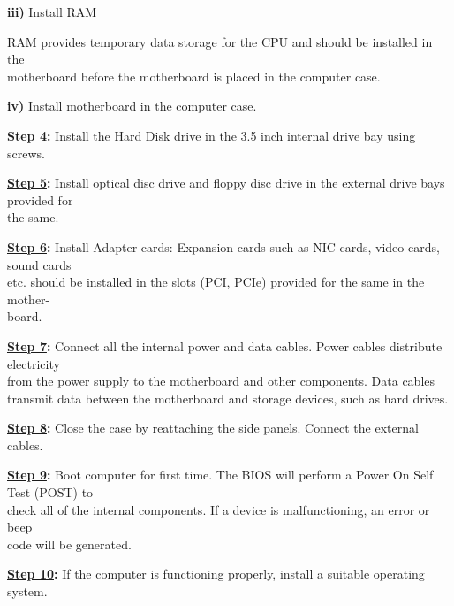 \documentclass[a4paper,28pt,twoside,openright]{report}
\begin{document}
\hspace{40pt}\textbf{iii)} Install RAM

\hspace{50pt}  RAM provides temporary data storage for the CPU and should be installed in the\\\hspace*{50pt}  motherboard before the motherboard is placed in the computer case.

\hspace{40pt}\textbf{iv)} Install motherboard in the computer case.


\textbf{\underline{Step 4}:} Install the Hard Disk drive in the 3.5 inch internal drive bay using screws.


\textbf{\underline{Step 5}:} Install optical disc drive and floppy disc drive in the external drive bays provided for\\\hspace*{40pt}the same.


\textbf{\underline{Step 6}:} Install Adapter cards: Expansion cards such as NIC cards, video cards, sound cards\\\hspace*{40pt}etc. should be installed in the slots (PCI, PCIe) provided for the same in the mother-\\\hspace*{40pt}board.


\textbf{\underline{Step 7}:} Connect all the internal power and data cables. Power cables distribute electricity \\\hspace*{40pt}from the power supply to the motherboard and other components. Data cables\\\hspace*{40pt}transmit data between the motherboard and storage devices, such as hard drives.


\textbf{\underline{Step 8}:} Close the case by reattaching the side panels. Connect the external cables.


\textbf{\underline{Step 9}:} Boot computer for first time. The BIOS will perform a Power On Self Test (POST) to\\\hspace*{40pt}check all of the internal components. If a device is malfunctioning, an error or beep\\\hspace*{40pt}code will be generated.


\textbf{\underline{Step 10}:} If the computer is functioning properly, install a suitable operating system.
\end{document}
